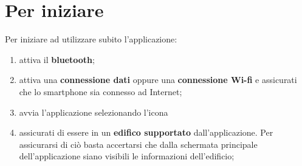 \documentclass[../ClipsManualeUtente.tex]{subfiles}
\begin{document}
\section{Per iniziare}
	Per iniziare ad utilizzare subito l'applicazione:
	\begin{enumerate}
		\item attiva il \textbf{bluetooth};
		\item attiva una \textbf{connessione dati} oppure una \textbf{connessione Wi-fi} e assicurati che lo smartphone sia connesso ad Internet;
		\item avvia l'applicazione selezionando l'icona %
		\item assicurati di essere in un \textbf{edifico supportato} dall'applicazione. Per assicurarsi di ciò basta accertarsi che dalla schermata principale dell'applicazione siano visibili le informazioni dell'edificio;
		

\end{enumerate}
\end{document}
